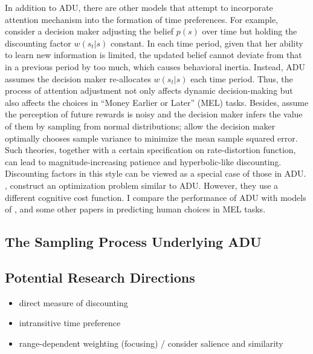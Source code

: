 \documentclass[
  12pt,
]{article}
\begin{document}
In addition to ADU, there are other models that attempt to incorporate
attention mechanism into the formation of time preferences. For example,
\citet{steiner_rational_2017} consider a decision maker adjusting the
belief \(p(s)\) over time but holding the discounting factor
\(w(s_t|s)\) constant. In each time period, given that her ability to
learn new information is limited, the updated belief cannot deviate from
that in a previous period by too much, which causes behavioral inertia.
Instead, ADU assumes the decision maker re-allocates \(w(s_t|s)\) each
time period. Thus, the process of attention adjustment not only affects
dynamic decision-making but also affects the choices in ``Money Earlier
or Later'' (MEL) tasks. Besides, \citet{gabaix_myopia_2017} assume the
perception of future rewards is noisy and the decision maker infers the
value of them by sampling from normal distributions;
\citet{gershman_rationally_2020} allow the decision maker optimally
chooses sample variance to minimize the mean sample squared error. Such
theories, together with a certain specification on rate-distortion
function, can lead to magnitude-increasing patience and hyperbolic-like
discounting. Discounting factors in this style can be viewed as a
special case of those in ADU. \citet{noor_optimal_2022},
\citet{noor_constrained_2023} construct an optimization problem similar
to ADU. However, they use a different cognitive cost function. I compare
the performance of ADU with models of \citet{gershman_rationally_2020},
\citet{noor_optimal_2022} and some other papers in predicting human
choices in MEL tasks.

\hypertarget{the-sampling-process-underlying-adu}{%
\subsection{The Sampling Process Underlying
ADU}\label{the-sampling-process-underlying-adu}}

\hypertarget{potential-research-directions}{%
\subsection{Potential Research
Directions}\label{potential-research-directions}}

\begin{itemize}
\item
  direct measure of discounting
\item
  intransitive time preference
\item
  range-dependent weighting (focusing) / consider salience and
  similarity
\end{itemize}

\renewcommand\refname{Reference}
  
\end{document}
